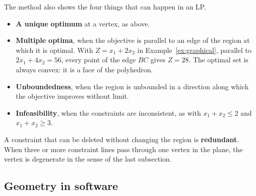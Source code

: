 \documentclass[11pt,a4paper]{article}
\numberwithin{equation}{section}
\theoremstyle{definition}
\begin{document}
The method also shows the four things that can happen in an LP.
\begin{itemize}
\item \textbf{A unique optimum} at a vertex, as above.
\item \textbf{Multiple optima}, when the objective is parallel to an edge of the region at which it is optimal. With $Z = x_1 + 2x_2$ in Example~\ref{ex:graphical}, parallel to $2x_1 + 4x_2 = 56$, every point of the edge $BC$ gives $Z = 28$. The optimal set is always convex: it is a face of the polyhedron.
\item \textbf{Unboundedness}, when the region is unbounded in a direction along which the objective improves without limit.
\item \textbf{Infeasibility}, when the constraints are inconsistent, as with $x_1 + x_2 \leq 2$ and $x_1 + x_2 \geq 3$.
\end{itemize}
A constraint that can be deleted without changing the region is \textbf{redundant}. When three or more constraint lines pass through one vertex in the plane, the vertex is degenerate in the sense of the last subsection.

\subsection{Geometry in software}
\label{ssec:software2}
\end{document}
